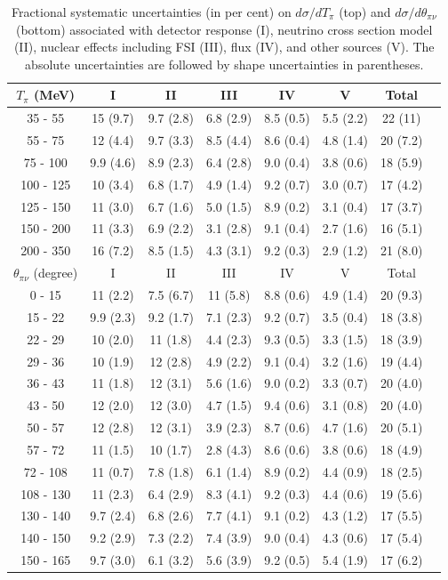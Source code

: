 \begingroup
\squeezetable
\begin{table}
\begin{tabular}{cccccccc}
\hline\hline
$T_{\pi}$ (MeV) & I & II & III & IV & V & Total \\
\hline
35 - 55 & 15 (9.7) & 9.7 (2.8) & 6.8 (2.9) & 8.5 (0.5) & 5.5 (2.2) & 22 (11) \\ 
55 - 75 & 12 (4.4) & 9.7 (3.3) & 8.5 (4.4) & 8.6 (0.4) & 4.8 (1.4) & 20 (7.2) \\ 
75 - 100 & 9.9 (4.6) & 8.9 (2.3) & 6.4 (2.8) & 9.0 (0.4) & 3.8 (0.6) & 18 (5.9) \\ 
100 - 125 & 10 (3.4) & 6.8 (1.7) & 4.9 (1.4) & 9.2 (0.7) & 3.0 (0.7) & 17 (4.2) \\ 
125 - 150 & 11 (3.0) & 6.7 (1.6) & 5.0 (1.5) & 8.9 (0.2) & 3.1 (0.4) & 17 (3.7) \\ 
150 - 200 & 11 (3.3) & 6.9 (2.2) & 3.1 (2.8) & 9.1 (0.4) & 2.7 (1.6) & 16 (5.1) \\ 
200 - 350 & 16 (7.2) & 8.5 (1.5) & 4.3 (3.1) & 9.2 (0.3) & 2.9 (1.2) & 21 (8.0) \\ 
\hline
\hline
$\theta_{\pi\nu}$ (degree) & I & II & III & IV & V & Total \\
\hline
0 - 15 & 11 (2.2) & 7.5 (6.7) & 11 (5.8) & 8.8 (0.6) & 4.9 (1.4) & 20 (9.3) \\ 
15 - 22 & 9.9 (2.3) & 9.2 (1.7) & 7.1 (2.3) & 9.2 (0.7) & 3.5 (0.4) & 18 (3.8) \\ 
22 - 29 & 10 (2.0) & 11 (1.8) & 4.4 (2.3) & 9.3 (0.5) & 3.3 (1.5) & 18 (3.9) \\ 
29 - 36 & 10 (1.9) & 12 (2.8) & 4.9 (2.2) & 9.1 (0.4) & 3.2 (1.6) & 19 (4.4) \\ 
36 - 43 & 11 (1.8) & 12 (3.1) & 5.6 (1.6) & 9.0 (0.2) & 3.3 (0.7) & 20 (4.0) \\ 
43 - 50 & 12 (2.0) & 12 (3.0) & 4.7 (1.5) & 9.4 (0.6) & 3.1 (0.8) & 20 (4.0) \\ 
50 - 57 & 12 (2.8) & 12 (3.1) & 3.9 (2.3) & 8.7 (0.6) & 4.7 (1.6) & 20 (5.1) \\ 
57 - 72 & 11 (1.5) & 10 (1.7) & 2.8 (4.3) & 8.6 (0.6) & 3.8 (0.6) & 18 (4.9) \\ 
72 - 108 & 11 (0.7) & 7.8 (1.8) & 6.1 (1.4) & 8.9 (0.2) & 4.4 (0.9) & 18 (2.5) \\ 
108 - 130 & 11 (2.3) & 6.4 (2.9) & 8.3 (4.1) & 9.2 (0.3) & 4.4 (0.6) & 19 (5.6) \\ 
130 - 140 & 9.7 (2.4) & 6.8 (2.6) & 7.7 (4.1) & 9.1 (0.2) & 4.3 (1.2) & 17 (5.5) \\ 
140 - 150 & 9.2 (2.9) & 7.3 (2.2) & 7.4 (3.9) & 9.0 (0.4) & 4.3 (0.6) & 17 (5.4) \\ 
150 - 165 & 9.7 (3.0) & 6.1 (3.2) & 5.6 (3.9) & 9.2 (0.5) & 5.4 (1.9) & 17 (6.2) \\ 
\hline\hline
\end{tabular}
\caption{Fractional systematic uncertainties (in per cent) on \cconepi $d\sigma/dT_{\pi}$ (top) and $d\sigma/d\theta_{\pi\nu}$ (bottom) 
associated with detector response (I), neutrino cross section model (II), nuclear effects including FSI (III), flux (IV), 
and other sources (V).  The absolute uncertainties are followed by shape uncertainties in parentheses.}
\label{tab:syst-pi}
\end{table}
\endgroup
